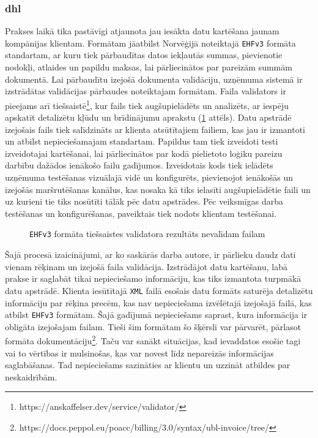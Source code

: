 \subsubsection{dhl}
\par Prakses laikā tika pastāvīgi atjaunota jau iesākta datu kartēšana jaunam kompānijas klientam. Formātam jāatbilst Norvēģijā noteiktajā \texttt{EHFv3} formāta standartam, ar kuru tiek pārbaudītas datos iekļautās summas, pievienotie nodokļi, atlaides un papildu maksas, lai pārliecinātos par pareizām summām dokumentā. Lai pārbaudītu izejošā dokumenta validāciju, uzņēmuma sistemā ir izstrādātas validācijas pārbaudes noteiktajam formātam. Faila validators ir pieejams arī tiešsaistē\footnote{https://anskaffelser.dev/service/validator/}, kur fails tiek augšupielādēts un analizēts, ar iespēju apskatīt detalizētu kļūdu un brīdinājumu aprakstu (\ref{orig:ehf} attēls). Datu apstrādē izejošais fails tiek salīdzināts ar klienta atsūtītajiem failiem, kas jau ir izmantoti un atbilst nepieciešamajam standartam. Papildus tam tiek izveidoti testi izveidotajai kartēšanai, lai pārliecinātos par kodā pielietoto loģiku pareizu darbību dažādos ienākošo failu gadījumos. Izveidotais kods tiek ielādēts uzņēmuma testēšanas vizuālajā vidē un konfigurēts, pievienojot ienākošās un izejošās maršrutēšanas kanālus, kas nosaka kā tiks ielasīti augšupielādētie faili un uz kurieni tie tiks nosūtīti tālāk pēc datu apstrādes. Pēc veiksmīgas darba testēšanas un konfigurēšanas, paveiktais tiek nodots klientam testēšanai.
\begin{figure}[H]
    \centering
    \caption{\texttt{EHFv3} formāta tiešsaistes validatora rezultāts nevalīdam failam}
    \label{orig:ehf}
\end{figure}
\par Šajā procesā izaicinājumi, ar ko saskārās darba autore, ir pārlieku daudz dati vienam rēķinam un izejošā faila validācija. Izstrādājot datu kartēšanu, labā prakse ir saglabāt tikai nepieciešamo informāciju, kas tiks izmantota turpmākā datu apstrādē. Klienta iesūtītajā \texttt{XML} failā esošais datu formāts saturēja detalizētu informāciju par rēķina precēm, kas nav nepieciešama izvēlētajā izejošajā failā, kas atbilst \texttt{EHFv3} formātam. Šajā gadījumā nepieciešams saprast, kura informācija ir obligāta izejošajam failam. Tieši šim formātam šo šķērsli var pārvarēt, pārlasot formāta dokumentāciju\footnote{https://docs.peppol.eu/poacc/billing/3.0/syntax/ubl-invoice/tree/}. Taču var sanākt situācijas, kad ievaddatos esošie tagi vai to vērtības ir mulsinošas, kas var novest līdz nepareizās informācijas saglabāšanas. Tad nepieciešams sazināties ar klientu un uzzināt atbildes par neskaidrībām.

